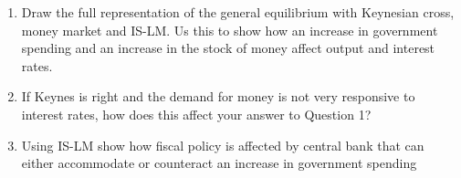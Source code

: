 \documentclass{article}
\begin{document}
\begin{enumerate}
\item Draw the full representation of the general equilibrium with Keynesian cross, money market and IS-LM.  Us this to show how an increase in government spending and an increase in the stock of money affect output and interest rates. 

\item If Keynes is right and the demand for money is not very responsive to interest rates, how does this affect your answer to Question 1? 

\item Using IS-LM show how fiscal policy is affected by central bank that 
can either accommodate or counteract an increase in government spending
\end{enumerate}
\end{document}
